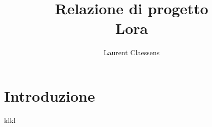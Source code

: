\documentclass[a4paper,12pt]{article}
\begin{document}
\title{Relazione di progetto\\Lora}
\author{Laurent Claessens}
\maketitle

\tableofcontents

\section{Introduzione}

klkl
\end{document}
